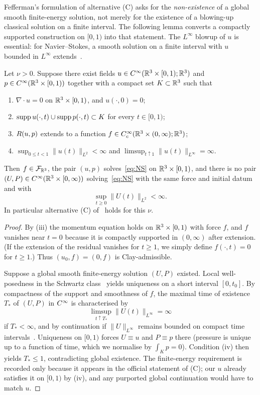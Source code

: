 {F}efferman's formulation of alternative (C) asks for the \emph{non-existence} of a global smooth finite-energy solution, not merely for the existence of a blowing-up classical solution on a finite interval. The following lemma converts a compactly supported construction on $[0,1)$ into that statement. The $L^\infty$ blowup of $u$ is essential: for {N}avier--{S}tokes, a smooth solution on a finite interval with $u$ bounded in $L^\infty$ extends~\cite{kato1972,fefferman2000}.

\begin{lemma}
\label{lem:residual-criterion}
Let $\nu>0$. Suppose there exist fields $u\in C^\infty(\mathbb{R}^3\times[0,1);\mathbb{R}^3)$ and $p\in C^\infty(\mathbb{R}^3\times[0,1))$ together with a compact set $K\subset\mathbb{R}^3$ such that
\begin{enumerate}[label=\textup{(\roman*)}]
\item $\nabla\cdot u=0$ on $\mathbb{R}^3\times[0,1)$, and $u(\cdot,0)=0$;
\item $\operatorname{supp} u(\cdot,t)\cup\operatorname{supp} p(\cdot,t)\subset K$ for every $t\in[0,1)$;
\item $R(u,p)$ extends to a function $f\in C_c^\infty(\mathbb{R}^3\times(0,\infty);\mathbb{R}^3)$;
\item $\displaystyle\sup_{0\le t<1}\|u(t)\|_{L^2}<\infty$ and $\displaystyle\limsup_{t\uparrow 1}\|u(t)\|_{L^\infty}=\infty$.
\end{enumerate}
Then $f\in\mathcal F_{\mathbb{R}^3}$, the pair $(u,p)$ solves~\eqref{eq:NS} on $\mathbb{R}^3\times[0,1)$, and there is no pair $(U,P)\in C^\infty(\mathbb{R}^3\times[0,\infty))$ solving~\eqref{eq:NS} with the same force and initial datum and with
\[
\sup_{t\ge 0}\|U(t)\|_{L^2}<\infty.
\]
In particular alternative \textup{(C)} of~\cite{fefferman2000} holds for this $\nu$.
\end{lemma}

\begin{proof}
By (iii) the momentum equation holds on $\mathbb{R}^3\times[0,1)$ with force $f$, and $f$ vanishes near $t=0$ because it is compactly supported in $(0,\infty)$ after extension. (If the extension of the residual vanishes for $t\ge 1$, we simply define $f(\cdot,t)=0$ for $t\ge 1$.) Thus $(u_0,f)=(0,f)$ is {C}lay-admissible.

Suppose a global smooth finite-energy solution $(U,P)$ existed. Local well-posedness in the Schwartz class~\cite{kato1972,temam2001} yields uniqueness on a short interval $[0,t_0]$. By compactness of the support and smoothness of $f$, the maximal time of existence $T_*$ of $(U,P)$ in $C^\infty$ is characterised by
\[
\limsup_{t\uparrow T_*}\|U(t)\|_{L^\infty}=\infty
\]
if $T_*<\infty$, and by continuation if $\|U\|_{L^\infty}$ remains bounded on compact time intervals~\cite{fefferman2000}. Uniqueness on $[0,1)$ forces $U\equiv u$ and $P\equiv p$ there (pressure is unique up to a function of time, which we normalise by $\int_K p=0$). Condition (iv) then yields $T_*\le 1$, contradicting global existence. The finite-energy requirement is recorded only because it appears in the official statement of (C); our $u$ already satisfies it on $[0,1)$ by (iv), and any purported global continuation would have to match $u$.
\end{proof}


